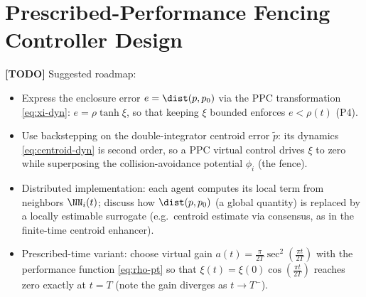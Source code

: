 \section{Prescribed-Performance Fencing Controller Design}
\label{sec:design}
\textbf{[TODO]} Suggested roadmap:
\begin{itemize}
    \item Express the enclosure error $e=\dist(p,p_0)$ via the PPC
    transformation \eqref{eq:xi-dyn}: $e=\rho\tanh\xi$, so that keeping
    $\xi$ bounded enforces $e<\rho(t)$ (P4).
    \item Use backstepping on the double-integrator centroid error
    $\tilde p$: its dynamics \eqref{eq:centroid-dyn} is second order, so a
    PPC virtual control drives $\xi$ to zero while superposing the
    collision-avoidance potential $\phi_i$ (the fence).
    \item Distributed implementation: each agent computes its local term
    from neighbors $\NN_i(t)$; discuss how $\dist(p,p_0)$ (a global
    quantity) is replaced by a locally estimable surrogate (e.g.\ centroid
    estimate via consensus, as in the finite-time centroid enhancer).
    \item Prescribed-time variant: choose virtual gain
    $a(t)=\frac{\pi}{2T}\sec^2(\frac{\pi t}{2T})$ with the performance
    function \eqref{eq:rho-pt} so that $\xi(t)=\xi(0)\cos(\frac{\pi t}{2T})$
    reaches zero exactly at $t=T$ (note the gain diverges as $t\to T^-$).
\end{itemize}
